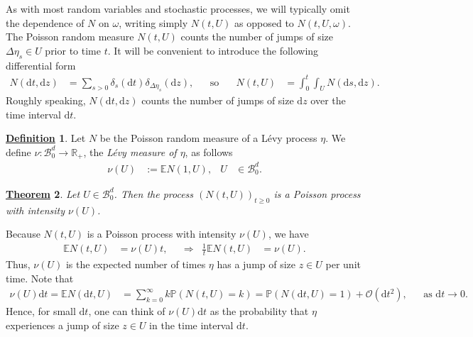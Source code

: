 \documentclass[12pt]{book}
\numberwithin{equation}{chapter}
\theoremstyle{plain}
\newtheorem{theorem}{\underline{Theorem}}
\numberwithin{theorem}{section}
\theoremstyle{definition}
\newtheorem{definition}[theorem]{\underline{Definition}}
\numberwithin{exercise}{chapter}
\newcommand{\<}{\langle}
\renewcommand{\>}{\rangle}
\renewcommand{\(}{\left(}
\renewcommand{\)}{\right)}
\renewcommand{\[}{\left[}
\renewcommand{\]}{\right]}
\newcommand\Eb{\mathds{E}}
\newcommand\Ib{\mathds{1}} 	%
\newcommand\Pb{\mathds{P}}
\newcommand\Rb{\mathds{R}}
\newcommand\Bc{\mathscr{B}}
\newcommand\Oc{\mathscr{O}}
\newcommand\om{\omega}
\newcommand\del{\delta}
\newcommand\Del{\Delta}
\newcommand\dd{\mathrm{d}}
\begin{document}
\noindent
As with most random variables and stochastic processes, we will typically omit the dependence of $N$ on $\om$, writing simply $N(t,U)$ as opposed to $N(t,U,\om)$.
The Poisson random measure $N(t,U)$ counts the number of jumps of size $\Del \eta_s \in U$ prior to time $t$.  It will be convenient to introduce the following differential form
\begin{align}
N(\dd t, \dd z)
	&=	\sum_{s>0} \del_{s}(\dd t) \del_{\Del \eta_s}(\dd z) , &
	&\text{so that}&
N(t,U)
	&=	\int_0^t \int_U N(\dd s, \dd z) .
\end{align}
Roughly speaking, $N(\dd t, \dd z)$ counts the number of jumps of size $\dd z$ over the time interval $\dd t$.

\begin{definition}
Let $N$ be the Poisson random measure of a L\'evy process $\eta$.  We define $\nu : \Bc_0^d \to \Rb_+$, the \emph{L\'evy measure of $\eta$}, as follows
\begin{align}
\nu(U)
	&:=	\Eb N(1,U) , &
U
	&\in \Bc_0^d .
\end{align}
\end{definition}

\begin{theorem}
\label{thm:poisson}
Let $U \in \Bc_0^d$.  Then the process $(N(t,U))_{t \geq 0}$ is a Poisson process with intensity $\nu(U)$.
\end{theorem}

\noindent
Because $N(t,U)$ is a Poisson process with intensity $\nu(U)$, we have
\begin{align}
\Eb N(t,U)
	&= \nu(U) t , &
	&\Rightarrow&
\frac{1}{t} \Eb N(t,U)
	&=	\nu(U) .
\end{align}
Thus, $\nu(U)$ is the expected number of times $\eta$ has a jump of size $z \in U$ per unit time.
Note that
\begin{align}
\nu(U) \dd t = \Eb N(\dd t, U)
	&=	\sum_{k=0}^\infty k \Pb( N(t,U) = k )
	=		\Pb( N( \dd t, U) = 1 ) + \Oc( \dd t^2 ) , &
	&\text{as $\dd t \to 0$}.
\end{align}
Hence, for small $\dd t$, one can think of $\nu( U) \dd t$ as the probability that $\eta$ experiences a jump of size $z \in U$ in the time interval $\dd t$.
\end{document}
